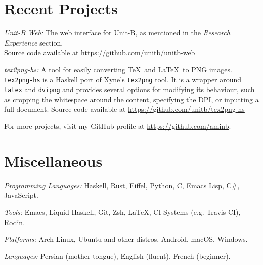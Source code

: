 \documentclass[12pt,letterpaper]{article}
\renewenvironment{itemize}{
  \begin{list}{}{
    \setlength{\leftmargin}{1.5em}
    \setlength{\itemsep}{0.25em}
    \setlength{\parskip}{0pt}
    \setlength{\parsep}{0.25em}
  }
}{
  \end{list}
}
\begin{document}
\section*{Recent Projects}

\begin{itemize}
\item \textit{Unit-B Web:} The web interface for Unit-B, as mentioned in the
  \textit{Research Experience} section.\\
  Source code available at
  \href{https://github.com/unitb/unitb-web}{https://github.com/unitb/unitb-web}

\item \textit{tex2png-hs:} A tool for easily converting \TeX\ and \LaTeX\ to
  \textsc{PNG} images. \texttt{tex2png-hs} is a Haskell port of Xyne's
  \texttt{tex2png} tool. It is a wrapper around \texttt{latex} and
  \texttt{dvipng} and provides several options for modifying its behaviour, such
  as cropping the whitespace around the content, specifying the \textsc{DPI}, or
  inputting a full document.
  Source code available at
  \href{https://github.com/unitb/tex2png-hs}{https://github.com/unitb/tex2png-hs}

\item For more projects, visit my GitHub profile at
  \href{https://github.com/aminb}{https://github.com/aminb}.
\end{itemize}

\section*{Miscellaneous}

\begin{itemize}
\item \textit{Programming Languages:} Haskell, Rust, Eiffel, Python, C, Emacs
  Lisp, C\#, JavaScript.
\item \textit{Tools:} Emacs, Liquid Haskell, Git, Zsh, \LaTeX, CI Systems
  (e.g. Travis CI), Rodin.
\item \textit{Platforms:} Arch Linux, Ubuntu and other distros, Android, macOS,
  Windows.
\item \textit{Languages:} Persian (mother tongue), English (fluent), French
  (beginner).
\end{itemize}


\end{document}
